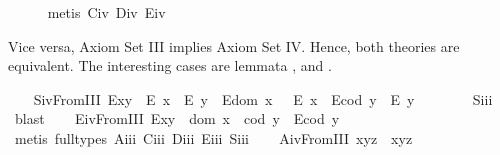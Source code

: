 \begin{isabellebody}
%
\isadelimproof
\ \ \ \ %
\endisadelimproof
%
\isatagproof
{}\isamarkupfalse%
\ {\isacharparenleft}metis\ C\isactrlsub i\isactrlsub v\ D\isactrlsub i\isactrlsub v\ E\isactrlsub i\isactrlsub v{\isacharparenright}%
\endisatagproof
{\isafoldproof}%
%
\isadelimproof
%
\endisadelimproof
%
\begin{isamarkuptext}%
Vice versa, Axiom Set III implies Axiom Set IV. Hence, both theories are
 equivalent. The interesting cases are lemmata , 
 and .%
\end{isamarkuptext}\isamarkuptrue%
\isanewline
\ \ \isamarkupfalse%
\ S\isactrlsub i\isactrlsub vFromIII{\isacharcolon}\ {\isachardoublequoteopen}{\isacharparenleft}E{\isacharparenleft}x{\isasymcdot}y{\isacharparenright}\ \isactrlbold {\isasymrightarrow}\ {\isacharparenleft}E\ x\ \isactrlbold {\isasymand}\ E\ y{\isacharparenright}{\isacharparenright}\ \isactrlbold {\isasymand}\ {\isacharparenleft}E{\isacharparenleft}dom\ x\ {\isacharparenright}\ \isactrlbold {\isasymrightarrow}\ E\ x{\isacharparenright}\ \isactrlbold {\isasymand}\ {\isacharparenleft}E{\isacharparenleft}cod\ y{\isacharparenright}\ \isactrlbold {\isasymrightarrow}\ E\ y{\isacharparenright}{\isachardoublequoteclose}\ \ \isanewline
%
\isadelimproof
\ \ \ \ %
\endisadelimproof
%
\isatagproof
{}\isamarkupfalse%
\ S\isactrlsub i\isactrlsub i\isactrlsub i\ \isamarkupfalse%
\ blast%
\endisatagproof
{\isafoldproof}%
%
\isadelimproof
\isanewline
%
\endisadelimproof
\ \ \isamarkupfalse%
\ E\isactrlsub i\isactrlsub vFromIII{\isacharcolon}\ {\isachardoublequoteopen}E{\isacharparenleft}x{\isasymcdot}y{\isacharparenright}\ \isactrlbold {\isasymleftrightarrow}\ {\isacharparenleft}dom\ x\ {\isasymcong}\ cod\ y\ \isactrlbold {\isasymand}\ E{\isacharparenleft}cod\ y{\isacharparenright}{\isacharparenright}{\isachardoublequoteclose}\ \isanewline
%
\isadelimproof
\ \ \ \ %
\endisadelimproof
%
\isatagproof
{}\isamarkupfalse%
\ {\isacharparenleft}metis\ {\isacharparenleft}full{\isacharunderscore}types{\isacharparenright}\ A\isactrlsub i\isactrlsub i\isactrlsub i\ C\isactrlsub i\isactrlsub i\isactrlsub i\ D\isactrlsub i\isactrlsub i\isactrlsub i\ E\isactrlsub i\isactrlsub i\isactrlsub i\ S\isactrlsub i\isactrlsub i\isactrlsub i{\isacharparenright}%
\endisatagproof
{\isafoldproof}%
%
\isadelimproof
\isanewline
%
\endisadelimproof
\ \ \isamarkupfalse%
\ A\isactrlsub i\isactrlsub vFromIII{\isacharcolon}\ {\isachardoublequoteopen}x{\isasymcdot}{\isacharparenleft}y{\isasymcdot}z{\isacharparenright}\ {\isasymcong}\ {\isacharparenleft}x{\isasymcdot}y{\isacharparenright}{\isasymcdot}z{\isachardoublequoteclose}\ \isanewline

\end{isabellebody}
